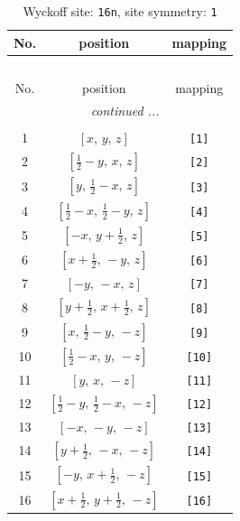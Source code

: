 \documentclass[fleqn,8pt]{jsarticle}
\begin{document}
\begin{longtable}{ccc}
\caption{Wyckoff site: {\tt 16n}, site symmetry: {\tt 1}}
 \\
 \hline \hline
No. & position & mapping \\ \hline \endfirsthead

\multicolumn{2}{l}{\tablename\ \thetable{}} \\
 \hline \hline
No. & position & mapping \\ \hline \endhead

 \hline \hline
\multicolumn{2}{r}{\footnotesize\it continued ...} \\ \endfoot

 \hline \hline
\multicolumn{2}{r}{} \\ \endlastfoot

1 & $\left[ x,\, y,\, z \right]$ & {\tt [1]} \\ \hline
2 & $\left[ \frac{1}{2} - y,\, x,\, z \right]$ & {\tt [2]} \\ \hline
3 & $\left[ y,\, \frac{1}{2} - x,\, z \right]$ & {\tt [3]} \\ \hline
4 & $\left[ \frac{1}{2} - x,\, \frac{1}{2} - y,\, z \right]$ & {\tt [4]} \\ \hline
5 & $\left[ - x,\, y + \frac{1}{2},\, z \right]$ & {\tt [5]} \\ \hline
6 & $\left[ x + \frac{1}{2},\, - y,\, z \right]$ & {\tt [6]} \\ \hline
7 & $\left[ - y,\, - x,\, z \right]$ & {\tt [7]} \\ \hline
8 & $\left[ y + \frac{1}{2},\, x + \frac{1}{2},\, z \right]$ & {\tt [8]} \\ \hline
9 & $\left[ x,\, \frac{1}{2} - y,\, - z \right]$ & {\tt [9]} \\ \hline
10 & $\left[ \frac{1}{2} - x,\, y,\, - z \right]$ & {\tt [10]} \\ \hline
11 & $\left[ y,\, x,\, - z \right]$ & {\tt [11]} \\ \hline
12 & $\left[ \frac{1}{2} - y,\, \frac{1}{2} - x,\, - z \right]$ & {\tt [12]} \\ \hline
13 & $\left[ - x,\, - y,\, - z \right]$ & {\tt [13]} \\ \hline
14 & $\left[ y + \frac{1}{2},\, - x,\, - z \right]$ & {\tt [14]} \\ \hline
15 & $\left[ - y,\, x + \frac{1}{2},\, - z \right]$ & {\tt [15]} \\ \hline
16 & $\left[ x + \frac{1}{2},\, y + \frac{1}{2},\, - z \right]$ & {\tt [16]} \\
\end{longtable}
\end{document}
